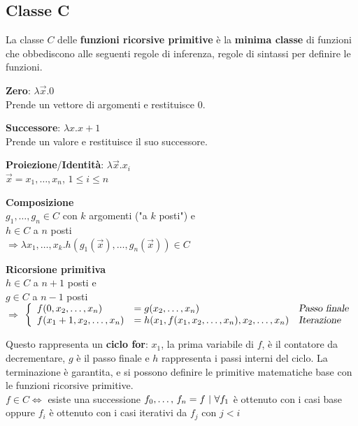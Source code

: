 \documentclass[10pt]{book}
\begin{document}
\subsection{Classe C}
La classe $C$ delle \textbf{funzioni ricorsive primitive} è la \textbf{minima classe} di funzioni che obbediscono alle seguenti regole di inferenza, regole di sintassi per definire le funzioni.\\
\begin{list}{}{\textbf{Casi base}}
	\item \textbf{Zero}: $\lambda \overrightarrow{x}.0$\\
	Prende un vettore di argomenti e restituisce 0.
	\item \textbf{Successore}: $\lambda x.x+1$\\
	Prende un valore e restituisce il suo successore.
	\item \textbf{Proiezione}/\textbf{Identità}: $\lambda \overrightarrow{x}.x_i$\\
	$\overrightarrow{x} = x_1,\ldots, x_n$, $1 \leq i \leq n$
\end{list}
\begin{list}{}{\textbf{Casi iterativi}}
	\item \textbf{Composizione}\\
	$g_1,\ldots, g_n \in C$ con $k$ argomenti ("a $k$ posti") e\\
	$h \in C$ a $n$ posti\\
	$\Rightarrow \lambda x_1, \ldots, x_k.h(g_1(\overrightarrow{x}),\ldots, g_n(\overrightarrow{x})) \in C$
	\item \textbf{Ricorsione primitiva}\\
	$h \in C$ a $n + 1$ posti e\\
	$g \in C$ a $n - 1$ posti\\
	$\Rightarrow$
	$\left\{
		\begin{array}{l l l}
			f(0, x_2, \ldots, x_n)&= g(x_2, \ldots, x_n)&\textsl{Passo finale}\\
			f(x_1 + 1, x_2, \ldots, x_n)&= h(x_1, f(x_1, x_2, \ldots, x_n), x_2,\ldots, x_n)&\textsl{Iterazione}
		\end{array}
		\right.$
\end{list}
Questo rappresenta un \textbf{ciclo for}: $x_1$, la prima variabile di $f$, è il contatore da decrementare, $g$ è il passo finale e $h$ rappresenta i passi interni del ciclo. La terminazione è garantita, e si possono definire le primitive matematiche base con le funzioni ricorsive primitive.\\
$f \in C \Leftrightarrow$ esiste una successione $f_0,\ldots,\,f_n = f\:\:\vline\:\:\forall f_1$ è ottenuto con i casi base oppure $f_i$ è ottenuto con i casi iterativi da $f_j$ con $j < i$
\pagebreak
\end{document}
